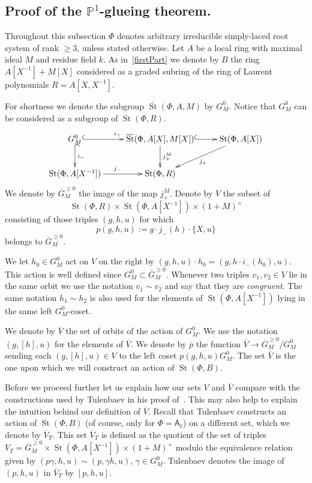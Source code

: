 \documentclass[oneside, 8pt]{amsart}
\theoremstyle{remark}
\theoremstyle{definition}
\numberwithin{lemma}{section}
\numberwithin{prop}{section}
\numberwithin{corollary}{section}
\numberwithin{externaltheorem}{section}
\DeclareMathOperator{\St}{St}
\newcommand{\inv}{^{-1}}
\newcommand{\rA}{\mathsf{A}}
\numberwithin{equation}{section}
\begin{document}
\subsection{Proof of the $\mathbb{P}^1$-glueing theorem.} \label{sec:P1glueing}
Throughout this subsection $\Phi$ denotes arbitrary irreducible simply-laced root system of rank $\geq 3$, unless stated otherwise. Let $A$ be a local ring with maximal ideal $M$ and residue field $k$. As in~\cref{firstPart} we denote by $B$ the ring $A[X\inv] + M[X]$ considered as a graded subring of the ring of Laurent polynomials $R = A[X, X\inv]$.

For shortness we denote the subgroup $\overline{\St}(\Phi, A, M)$ by $G_M^0$.
Notice that $G_M^0$ can be considered as a subgroup of $\St(\Phi, R)$.
\[ \xymatrix{ G_M^0 \ar@{^{(}->}[r]^{i_+} \ar@{^{(}->}[d]^{i_-} & \overline{\St}(\Phi, A[X], M[X]) \ar^{j_+^M}[d] \ar@{^{(}->}[r] & \St(\Phi, A[X]) \ar[dl]^{j_+} \\
              \St(\Phi, A[X\inv]) \ar[r]^{j_-} & \St(\Phi, R) &  } \] 
We denote by $\overline{G}^{\geq 0}_M$ the image of the map $j_+^M$. 
Denote by $V$ the subset of \[\St(\Phi, R) \times \St(\Phi, A[X\inv]) \times (1 + M)^\times\] consisting of those triples $(g, h, u)$ for which
\[p(g, h, u) := g \cdot j_-(h) \cdot \{ X, u \}\] belongs to $\overline{G}_M^{\geq 0}$.

We let $h_0 \in G_M^0$ act on $V$ on the right by $(g, h, u) \cdot h_0 = (g, h \cdot i_-(h_0), u)$. This action is well defined since $G^0_M \subset \overline{G}^{\geq 0}_M$. Whenever two triples $v_1, v_2 \in V$ lie in the same orbit we use the notation $v_1 \sim v_2$ and say that they are {\it congruent}. The same notation $h_1 \sim h_2$ is also used for the elements of $\St(\Phi, A[X\inv])$ lying in the same left $G^0_M$-coset.

We denote by $\overline{V}$ the set of orbits of the action of $G_M^0$.
We use the notation $(g, [h], u)$ for the elements of $\overline{V}$.
We denote by $\overline{p}$ the function $\overline{V} \to \overline{G}^{\geq 0}_M/G_M^0$ sending each $(g, [h], u) \in V$ to the left coset $p(g, h, u)G_M^0$.
The set $\overline{V}$ is the one upon which we will construct an action of $\St(\Phi, B)$.

Before we proceed further let us explain how our sets $V$ and $\overline{V}$ compare with the constructions used by Tulenbaev in his proof of~\cite[Proposition~4.3]{Tu83}. This may also help to explain the intuition behind our definition of $\overline{V}$. Recall that Tulenbaev constructs an action of $\St(\Phi, B)$ (of course, only for $\Phi = \rA_\ell$) on a different set, which we denote by $\overline{V}_T$. This set $\overline{V}_T$ is defined as the quotient of the set of triples $V_T = \overline{G}_M^{\geq 0} \times \St(\Phi, A[X\inv]) \times (1+M)^\times$ modulo the equivalence relation given by $(p \gamma, h, u) \sim (p, \gamma h, u)$, $\gamma \in G^0_M$. Tulenbaev denotes the image of $(p, h, u)$ in $\overline{V}_T$ by $[p, h, u]$.
\end{document}
